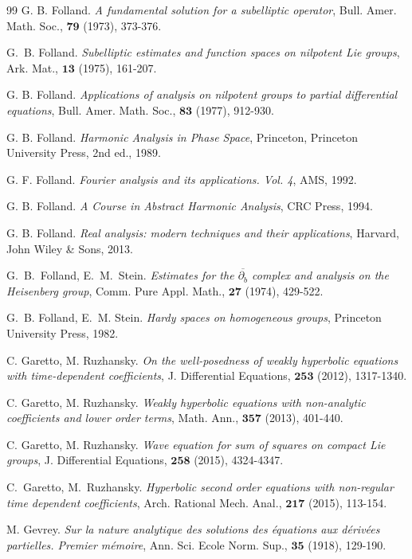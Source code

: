 \documentclass[12pt,oneside,a4paper]{book}
\numberwithin{equation}{section}     %
\theoremstyle{plain}
\theoremstyle{definition}
\begin{document}
\begin{thebibliography}{99}
	G. B. Folland.
	\emph{A fundamental solution for a subelliptic operator}, 
	Bull. Amer. Math. Soc., $\mathbf{79}$ (1973), 373-376.
	
	G.~B. Folland.
	\emph{Subelliptic estimates and function spaces on nilpotent {L}ie groups},
	Ark. Mat., $\mathbf{13}$ (1975), 161-207.
	
	G. B. Folland.
	\emph{Applications of analysis on nilpotent groups to partial differential equations},
	Bull. Amer. Math. Soc., $\mathbf{83}$ (1977), 912-930.
	
	G. B. Folland.
	\emph{Harmonic Analysis in Phase Space},
	Princeton, Princeton University Press, 2nd ed., 1989. 
	
	G. F. Folland.
	\emph{Fourier analysis and its applications. Vol. 4},
	AMS, 1992.
	
	G. B. Folland.
	\emph{A Course in Abstract Harmonic Analysis},
	CRC Press, 1994.
	
	G. B. Folland.
	\emph{Real analysis: modern techniques and their applications},
	Harvard, John Wiley \& Sons, 2013.
	
	G.~B.~Folland, E.~M.~Stein.
	\emph{Estimates for the $\overline{\partial_{b}}$ complex and analysis on the Heisenberg group},
	Comm. Pure Appl. Math., $\mathbf{27}$ (1974), 429-522.
	
	G.~B. Folland, E.~M. Stein.
	\emph{Hardy spaces on homogeneous groups}, 
	Princeton University Press, 1982.
	
	C. Garetto, M. Ruzhansky.
	\emph{On the well-posedness of weakly hyperbolic equations with time-dependent coefficients},
	J. Differential Equations, $\mathbf{253}$ (2012), 1317-1340.
	
	C. Garetto, M. Ruzhansky.
	\emph{Weakly hyperbolic equations with non-analytic coefficients and lower order terms}, 
	Math. Ann., $\mathbf{357}$ (2013), 401-440.
	
	C. Garetto, M. Ruzhansky.
	\emph{Wave equation for sum of squares on compact Lie groups},
	J. Differential Equations, $\mathbf{258}$ (2015), 4324-4347.
	
	C.~Garetto, M.~Ruzhansky.
	\emph{Hyperbolic second order equations with non-regular time dependent coefficients},
	Arch. Rational Mech. Anal., $\mathbf{217}$ (2015), 113-154.
	
	
	M. Gevrey.
	\emph{Sur la nature analytique des solutions des \'equations aux d\'eriv\'ees partielles. Premier m\'emoire}, Ann. Sci. Ecole Norm. Sup., $\mathbf{35}$ (1918), 129-190.
	

\end{thebibliography}
\end{document}
